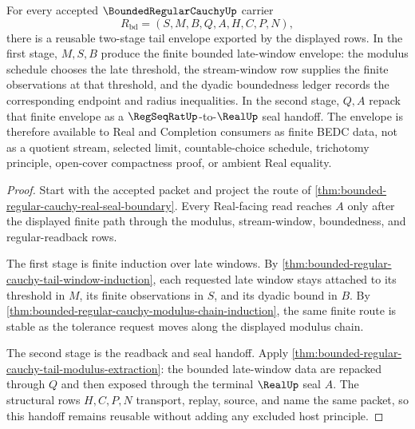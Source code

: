 \begin{theorem}
\label{thm:bounded-regular-cauchy-two-stage-tail-envelope}
For every accepted $\BoundedRegularCauchyUp$ carrier
$$
R_{\mathrm{bd}}=(S,M,B,Q,A,H,C,P,N),
$$
there is a reusable two-stage tail envelope exported by the displayed rows. In the first stage, $M,S,B$ produce the finite bounded late-window envelope: the modulus schedule chooses the late threshold, the stream-window row supplies the finite observations at that threshold, and the dyadic boundedness ledger records the corresponding endpoint and radius inequalities. In the second stage, $Q,A$ repack that finite envelope as a $\RegSeqRatUp$-to-$\RealUp$ seal handoff. The envelope is therefore available to Real and Completion consumers as finite BEDC data, not as a quotient stream, selected limit, countable-choice schedule, trichotomy principle, open-cover compactness proof, or ambient Real equality.
\end{theorem}
\begin{proof}
Start with the accepted packet and project the route of \autoref{thm:bounded-regular-cauchy-real-seal-boundary}. Every Real-facing read reaches $A$ only after the displayed finite path through the modulus, stream-window, boundedness, and regular-readback rows.

The first stage is finite induction over late windows. By \autoref{thm:bounded-regular-cauchy-tail-window-induction}, each requested late window stays attached to its threshold in $M$, its finite observations in $S$, and its dyadic bound in $B$. By \autoref{thm:bounded-regular-cauchy-modulus-chain-induction}, the same finite route is stable as the tolerance request moves along the displayed modulus chain.

The second stage is the readback and seal handoff. Apply \autoref{thm:bounded-regular-cauchy-tail-modulus-extraction}: the bounded late-window data are repacked through $Q$ and then exposed through the terminal $\RealUp$ seal $A$. The structural rows $H,C,P,N$ transport, replay, source, and name the same packet, so this handoff remains reusable without adding any excluded host principle.
\end{proof}

